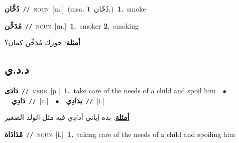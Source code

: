 \documentclass[10pt,a4paper,twoside]{article} %
\begin{document}
\begin{multicols}{2}
{\setlength\topsep{0pt}\textbf{\foreignlanguage{arabic}{دُخَّان}}\ {\color{gray}\texttt{//}\color{black}}\ \textsc{noun}\ [m.]\ \color{gray}(msa. \foreignlanguage{arabic}{دُخّان}~\foreignlanguage{arabic}{\textbf{١.}})\color{black}\ \textbf{1.}~smoke\ } \vspace{2mm}

{\setlength\topsep{0pt}\textbf{\foreignlanguage{arabic}{مُدَخِّن}}\ {\color{gray}\texttt{//}\color{black}}\ \textsc{noun}\ [m.]\ \textbf{1.}~smoker  \textbf{2.}~smoking\  \begin{flushright}\color{gray}\foreignlanguage{arabic}{\textbf{\underline{\foreignlanguage{arabic}{أمثلة}}}: جوزك مُدَخِّن كمان؟}\end{flushright}\color{black}} \vspace{2mm}

\vspace{-3mm}
\subsection*{\color{blue}\foreignlanguage{arabic}{د.د.ي}\color{blue}{}} 

{\setlength\topsep{0pt}\textbf{\foreignlanguage{arabic}{دَادَى}}\ {\color{gray}\texttt{//}\color{black}}\ \textsc{verb}\ [p.]\ \textbf{1.}~take care of the needs of a child and spoil him\ \ $\bullet$\ \ \setlength\topsep{0pt}\textbf{\foreignlanguage{arabic}{دَادِي}}\ {\color{gray}\texttt{//}\color{black}}\ [c.]\ \ $\bullet$\ \ \setlength\topsep{0pt}\textbf{\foreignlanguage{arabic}{يدَادِي}}\ {\color{gray}\texttt{//}\color{black}}\ [i.]\  \begin{flushright}\color{gray}\foreignlanguage{arabic}{\textbf{\underline{\foreignlanguage{arabic}{أمثلة}}}: بده إياني أدادِي فيه مثل الولد الصغير}\end{flushright}\color{black}} \vspace{2mm}

{\setlength\topsep{0pt}\textbf{\foreignlanguage{arabic}{مْدَادَاة}}\ {\color{gray}\texttt{//}\color{black}}\ \textsc{noun}\ [f.]\ \textbf{1.}~taking care of the needs of a child and spoiling him\ } \vspace{2mm}


\end{multicols}
\end{document}
